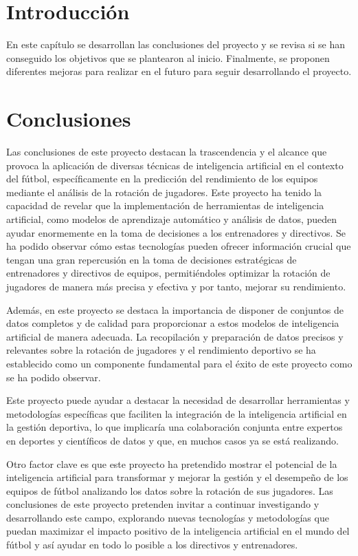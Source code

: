
\section{Introducción}
En este capítulo se desarrollan las conclusiones del proyecto y se revisa si se han conseguido los objetivos que se plantearon al inicio. Finalmente, se proponen diferentes mejoras para realizar en el futuro para seguir desarrollando el proyecto.


\section{Conclusiones}
Las conclusiones de este proyecto destacan la trascendencia y el alcance que provoca la aplicación de diversas técnicas de inteligencia artificial en el contexto del fútbol, específicamente en la predicción del rendimiento de los equipos mediante el análisis de la rotación de jugadores. Este proyecto ha tenido la capacidad de revelar que la implementación de herramientas de inteligencia artificial, como modelos de aprendizaje automático y análisis de datos, pueden ayudar enormemente en la toma de decisiones a los entrenadores y directivos. Se ha podido observar cómo estas tecnologías pueden ofrecer información crucial que tengan una gran repercusión en la toma de decisiones estratégicas de entrenadores y directivos de equipos, permitiéndoles optimizar la rotación de jugadores de manera más precisa y efectiva y por tanto, mejorar su rendimiento.

Además, en este proyecto se destaca la importancia de disponer de conjuntos de datos completos y de calidad para proporcionar a estos modelos de inteligencia artificial de manera adecuada. La recopilación y preparación de datos precisos y relevantes sobre la rotación de jugadores y el rendimiento deportivo se ha establecido como un componente fundamental para el éxito de este proyecto como se ha podido observar. 

Este proyecto puede ayudar a destacar la necesidad de desarrollar herramientas y metodologías específicas que faciliten la integración de la inteligencia artificial en la gestión deportiva, lo que implicaría una colaboración conjunta entre expertos en deportes y científicos de datos y que, en muchos casos ya se está realizando.

Otro factor clave es que este proyecto ha pretendido mostrar el potencial de la inteligencia artificial para transformar y mejorar la gestión y el desempeño de los equipos de fútbol analizando los datos sobre la rotación de sus jugadores. Las conclusiones de este proyecto pretenden invitar a continuar investigando y desarrollando este campo, explorando nuevas tecnologías y metodologías que puedan maximizar el impacto positivo de la inteligencia artificial en el mundo del fútbol y así ayudar en todo lo posible a los directivos y entrenadores.

